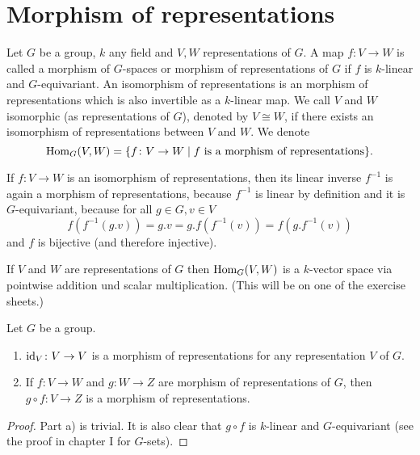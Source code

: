 \section{Morphism of representations}


\begin{defi}
Let $G$ be a group, $k$ any field and $V,W$ representations of $G$. A map $f \colon V \to W$ is called a morphism of $G$-spaces or morphism  of representations of $G$ if $f$ is $k$-linear and $G$-equivariant. An isomorphism of representations is an morphism of representations which is also invertible as a $k$-linear map. We call $V$ and $W$ isomorphic (as representations of $G$), denoted by $V \cong W$, if there exists an isomorphism of representations between $V$ and $W$. We denote
\[
 \operatorname{Hom}_G(V,W) = \{f \colon V \to W \mid f \text{ is a morphism of representations}\}.
\]
\end{defi}


\begin{rem}
 If $f \colon V \to W$ is an isomorphism of representations, then its linear inverse $f^{-1}$ is again a morphism of representations, because $f^{-1}$ is linear by definition and it is $G$-equivariant, because for all $g \in G, v \in V$
 \[
  f\left(f^{-1}(g.v)\right) = g.v = g.f\left(f^{-1}(v)\right) = f\left(g.f^{-1}(v)\right)
 \]
 and $f$ is bijective (and therefore injective).
\end{rem}


\begin{rem}
 If $V$ and $W$ are representations of $G$ then $\operatorname{Hom}_G(V,W)$ is a $k$-vector space via pointwise addition und scalar multiplication. (This will be on one of the exercise sheets.)
\end{rem}


\begin{lem}\label{lem: composition of morphisms of representations}
 Let $G$ be a group.
 \begin{enumerate}[label=\emph{\alph*})]
  \item
  $\operatorname{id}_V \colon V \to V$ is a morphism of representations for any representation $V$ of $G$.
  \item
  If $f \colon V \to W$  and $g \colon W \to Z$ are morphism of representations of $G$, then $g \circ f \colon V \to Z$ is a morphism of representations.
 \end{enumerate}
\end{lem}
\begin{proof}
 Part a) is trivial. It is also clear that $g \circ f$ is $k$-linear and $G$-equivariant (see the proof in chapter I for $G$-sets).
\end{proof}


